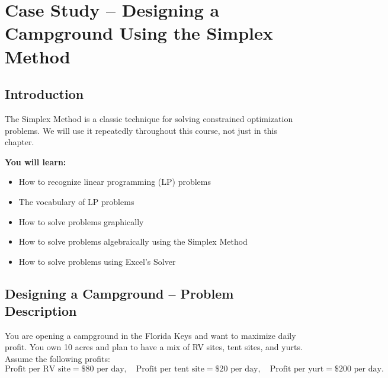 \chapter{Case Study -- Designing a Campground Using the Simplex Method}
\label{ch:campground_simplex}

\section{Introduction}
The Simplex Method is a classic technique for solving constrained optimization problems. We will use it repeatedly throughout this course, not just in this chapter.

\begin{outcome}
\textbf{You will learn:}
\begin{itemize}
    \item How to recognize linear programming (LP) problems
    \item The vocabulary of LP problems
    \item How to solve problems graphically
    \item How to solve problems algebraically using the Simplex Method
    \item How to solve problems using Excel’s Solver
\end{itemize}
\end{outcome}

\section{Designing a Campground -- Problem Description}
You are opening a campground in the Florida Keys and want to maximize daily profit. You own 10 acres and plan to have a mix of RV sites, tent sites, and yurts. Assume the following profits:
\[
\text{Profit per RV site} = \$80 \text{ per day}, \quad 
\text{Profit per tent site} = \$20 \text{ per day}, \quad 
\text{Profit per yurt} = \$200 \text{ per day}.
\]

